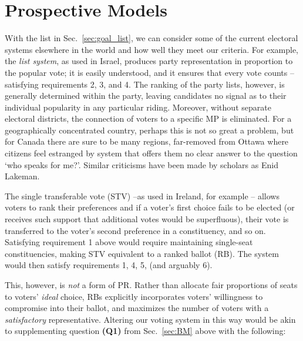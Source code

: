 \section{Prospective Models}
\label{sec:alt_models}

With the list in Sec.~\ref{sec:goal_list}, we can consider some of the current electoral systems elsewhere in the world and how well they meet our criteria. For example, the \emph{list system}, as used in Israel, produces party representation in proportion to the popular vote; it is easily understood, and it ensures that every vote counts \---satisfying requirements 2, 3, and 4.
The ranking of the party lists, however, is generally determined within the party, leaving candidates no signal as to their individual popularity in any particular riding. Moreover, without separate electoral districts, the connection of voters to a specific MP is eliminated. 
For a geographically concentrated country, perhaps this is not so great a problem, but for Canada there are sure to be many regions, far-removed from Ottawa where citizens feel estranged by system that offers them no clear answer to the question `who speaks for me?'. Similar criticisms have been made by scholars as Enid Lakeman\cite{Lakeman}.

The single transferable vote (STV) \---as used in Ireland, for example\cite{Irish_howto_vote_doc}
\--- allows voters to  rank their preferences and if a voter's first choice fails to be elected (or receives such support that additional votes would be superfluous), their vote is transferred to the voter's second preference in a constituency, and so on.
Satisfying requirement 1 above would require maintaining single-seat constituencies, making STV equivalent to a ranked ballot (RB). The system would then satisfy requirements 1, 4, 5, (and arguably 6).

This, however, is \emph{not} a form of PR.
Rather than allocate fair proportions of seats to voters' \emph{ideal} choice, RBs explicitly incorporates voters' willingness to compromise into their ballot, and maximizes the number of voters with a \emph{satisfactory} representative.
Altering our voting system in this way would be akin to supplementing question \textbf{(Q1)} from Sec.~\ref{sec:BM} above with the following:

